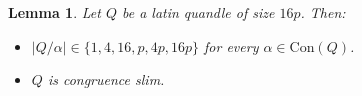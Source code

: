 \documentclass[a4paper, english, 9pt]{amsart}
\theoremstyle{plain}
\newtheorem{lemma}[theorem]{Lemma}
\theoremstyle{definition}
\def\con{\mathrm{Con}}
\def\comment#1{{\color{red} #1}}
\def\Ma{\mathcal Max}
\def\ma{\mathcal Min}
\begin{document}
\begin{lemma}\label{meet of max is min}
Let $Q$ be a latin quandle of size $16p$. Then:

\begin{itemize}

\item[(i)] $|Q/\alpha|\in \{1,4,16,p,4p,16p\}$ for every $\alpha	\in \con(Q)$.	

\item[(ii)] $Q$ is congruence slim.


 
 
\end{itemize}



\end{lemma}
\end{document}
